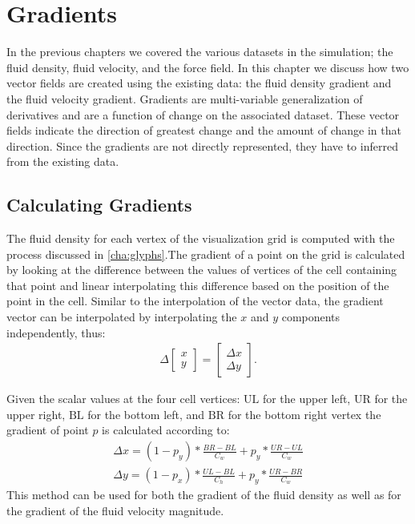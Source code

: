 \chapter{Gradients} %
\label{cha:gradients}
In the previous chapters we covered the various datasets in the simulation; the fluid density, fluid velocity, and the force field. In this chapter we discuss how two vector fields are created using the existing data: the fluid density gradient and the fluid velocity gradient. Gradients are multi-variable generalization of derivatives and are a function of change on the associated dataset. These vector fields indicate the direction of greatest change and the amount of change in that direction. Since the gradients are not directly represented, they have to inferred from the existing data.

\section{Calculating Gradients} %
\label{sec:calculating_gradients}
The fluid density for each vertex of the visualization grid is computed with the process discussed in \cref{cha:glyphs}.The gradient of a point on the grid is calculated by looking at the difference between the values of vertices of the cell containing that point and linear interpolating this difference based on the position of the point in the cell. Similar to the interpolation of the vector data, the gradient vector can be interpolated by interpolating the $x$ and $y$ components independently, thus: 
\begin{align*}
\Delta \begin{bmatrix}x\\y \end{bmatrix} = \begin{bmatrix}\Delta x\\\Delta y \end{bmatrix} .
\end{align*}

Given the scalar values at the four cell vertices: $\text{UL}$ for the upper left, $\text{UR}$ for the upper right, $\text{BL}$ for the bottom left, and $\text{BR}$ for the bottom right vertex the gradient of point $p$ is calculated according to:
\begin{align*}\label{eq:gradient}
	\Delta x = (1 - p_y) * \frac{BR - BL}{C_w} +
      p_y * \frac{UR - UL}{C_w}\\
	\Delta y = (1 - p_x) * \frac{UL - BL}{C_h} +
      p_y * \frac{UR - BR}{C_w}
\end{align*}
This method can be used for both the gradient of the fluid density as well as for the gradient of the fluid velocity magnitude.

